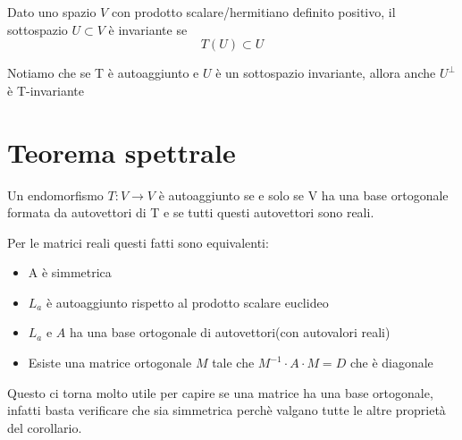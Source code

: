 \documentclass[a4paper, 10pt]{article}
\begin{document}
Dato uno spazio $V$ con prodotto scalare/hermitiano definito positivo, il sottospazio $U \subset V$ è invariante se $$T(U) \subset U$$

Notiamo che se T è autoaggiunto e $U$ è un sottospazio invariante, allora anche $U^\perp$ è T-invariante

\section{Teorema spettrale}

Un endomorfismo $T: V \rightarrow V$ è autoaggiunto se e solo se V ha una base ortogonale formata da autovettori di T e se tutti questi autovettori sono reali.

Per le matrici reali questi fatti sono equivalenti:

\begin{itemize}
	\item A è simmetrica
	\item $L_a$ è autoaggiunto rispetto al prodotto scalare euclideo
	\item $L_a$ e $A$ ha una base ortogonale di autovettori(con autovalori reali)
	\item Esiste una matrice ortogonale $M$ tale che $M^{-1} \cdot A \cdot M = D$ che è diagonale
\end{itemize}

Questo ci torna molto utile per capire se una matrice ha una base ortogonale, infatti basta verificare che sia simmetrica perchè valgano tutte le altre proprietà del corollario.
\end{document}
